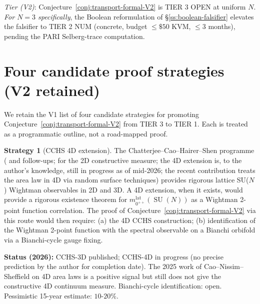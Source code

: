 \documentclass[11pt,a4paper,reqno]{amsart}
\theoremstyle{definition}
\newtheorem{strategy}{Strategy}
\DeclareMathOperator{\SU}{SU}
\begin{document}
\emph{Tier (V2)}: Conjecture~\ref{conj:transport-formal-V2} is TIER 3 OPEN at uniform $N$. \emph{For $N=3$ specifically}, the Boolean reformulation of \S\ref{ss:boolean-falsifier} elevates the falsifier to TIER 2 NUM (concrete, budget $\leq \$50$ KVM, $\leq 3$ months), pending the PARI Selberg-trace computation.

\section{Four candidate proof strategies (V2 retained)}\label{sec:strategies}

We retain the V1 list of four candidate strategies for promoting Conjecture~\ref{conj:transport-formal-V2} from TIER 3 to TIER 1. Each is treated as a programmatic outline, not a road-mapped proof.

\begin{strategy}[CCHS 4D extension]\label{strat:CCHS}
The Chatterjee--Cao--Hairer--Shen programme (\cite{Chatterjee2020} and follow-ups; \cite{CCHS2D2020} for the 2D constructive measure; the 4D extension is, to the author's knowledge, still in progress as of mid-2026; the recent \cite{CaoSheffield2025} contribution treats the area law in 4D via random surface techniques) provides rigorous lattice SU($N$) Wightman observables in 2D and 3D. A 4D extension, when it exists, would provide a rigorous existence theorem for $m_{0^{++}}^{\mathrm{lat}}(\SU(N))$ as a Wightman 2-point function correlation. The proof of Conjecture~\ref{conj:transport-formal-V2} via this route would then require: (a) the 4D CCHS construction; (b) identification of the Wightman 2-point function with the spectral observable on a Bianchi orbifold via a Bianchi-cycle gauge fixing.

\textbf{Status (2026):} CCHS-3D published; CCHS-4D in progress (no precise prediction by the author for completion date). The 2025 work of Cao--Nissim--Sheffield \cite{CaoSheffield2025} on 4D area laws is a positive signal but still does not give the constructive 4D continuum measure. Bianchi-cycle identification: open. Pessimistic 15-year estimate: $10$-$20\%$.
\end{strategy}
\end{document}
